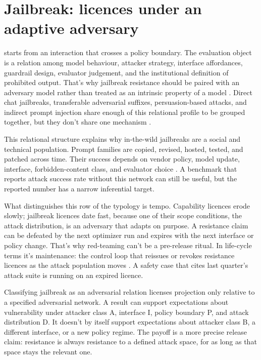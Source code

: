 \documentclass[12pt]{article}
\begin{document}
\section{Jailbreak: licences under an adaptive adversary}\label{sec:jailbreak}

 starts from an interaction that crosses a policy boundary. The
evaluation object is a relation among model behaviour, attacker strategy,
interface affordances, guardrail design, evaluator judgement, and the
institutional definition of prohibited output. That's why jailbreak resistance
should be paired with an adversary model rather than treated as an intrinsic
property of a model \citep{yi2024jailbreak,vassilev2024adversarial}. Direct
chat jailbreaks, transferable adversarial suffixes, persuasion-based attacks,
and indirect prompt injection share enough of this relational profile to be
grouped together, but they don't share one mechanism
\citep{zou2023universal,zeng2024johnny,greshake2023not}.

This relational structure explains why in-the-wild jailbreaks are a social and
technical population. Prompt families are copied, revised, hosted, tested, and
patched across time. Their success depends on vendor policy, model update,
interface, forbidden-content class, and evaluator choice
\citep{shen2024do}. A benchmark that reports attack success rate without this
network can still be useful, but the reported number has a narrow inferential
target.

What distinguishes this row of the typology is tempo. Capability licences erode
slowly; jailbreak licences date fast, because one of their scope conditions,
the attack distribution, is an adversary that adapts on purpose. A resistance
claim can be defeated by the next optimizer run and expires with the next
interface or policy change. That's why red-teaming can't be a pre-release
ritual. In life-cycle terms it's maintenance: the control loop that reissues or
revokes resistance licences as the attack population moves
\citep{weinberger2026HomeostasisCausalControl}. A safety case that cites last
quarter's attack suite is running on an expired licence.

Classifying jailbreak as an adversarial relation licenses projection only
relative to a specified adversarial network. A result can support expectations
about vulnerability under attacker class A, interface I, policy boundary P, and
attack distribution D. It doesn't by itself support expectations about attacker
class B, a different interface, or a new policy regime. The payoff is a more
precise release claim: resistance is always resistance to a defined attack
space, for as long as that space stays the relevant one.
\end{document}
